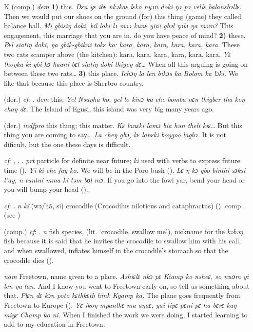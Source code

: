 \begin{letter}{K}
 (comp.) \textit{dem} \textbf{1)} this. \textit{Dɛn yɛ ibɛ nkɔkaɛ lɛko nyɔn doki ŋɔ pɔ vellɛ balansbɔllɛ.} Then we would put our shoes on the ground (for) this thing (game) they called balance ball. \textit{Mi gbisiŋ doki, bil loki lɔ mɔɔ kunɛ yini gbɔl ŋɔlɔ ŋa mɔm?} This engagement, this marriage that you are in, do you have peace of mind? \textbf{2)} these. \textit{Bɛl siatiŋ doki, ŋa gbik-gbikni tokɛ ko: kara, kara, kara, kara, kara, kara.} These two rats scamper above (the kitchen): kara, kara, kara, kara, kara, kara. \textit{Yɛ thoŋka ki gbi kɔ haani bɛl siatiŋ doki thiyeŋ dɛ…} When all this arguing is going on between these two rats… \textbf{3)} this place. \textit{Ichɔŋ la len bikɔs ka Bolom ka lɔki.} We like that because this place is Sherbro country. 

 (der.) \textit{cf}: . \textit{dem} this. \textit{Yel Nsaŋha ko, yel lo kinɔ ka che bomba nɛn thigber tha koŋ chaŋ dɛ.} The Island of Egusi, this island was very big many years ago.

 (der.) \textit{indfpro} this thing; this matter. \textit{Kɛ lanɛki lamɔ bia hun theli kiɛ…} But this thing you are coming to say… \textit{La cheŋ gbɔ, kɛ lanɛki boŋgoo lagbɔ.} It is not dificult, but the one these days is difficult.

 \textit{cf}: , , . \textit{prt} particle for definite near future; \textit{ki} used with verbs to express future time (\citealt{Sumner1921}). \textit{Yi ki che fay ko.} We will be in the Poro bush (\citealt{Pichl1967}). \textit{Lɛ ŋ kɔ gbo binthi sɔksi l'ay, n tuntni mma ki təm bo̹l mɔ.} If you go into the fowl yar, bend your head or you will bump your head (\citealt{Pichl1967}). 

 \textit{cf}: . \textit{n} \textit{kï} (wɔ/hã, si) crocodile (Crocodilus niloticus and cataphractus) (\citealt{Pichl1967}). comp.  (see ) 

 (comp.) \textit{cf}: . \textit{n} fish species, (lit. ‘crocodile, swallow me'), nickname for the \textit{kəbəŋ} fish because it is said that he invites the crocodile to swallow him with his call, and when swallowed, inflates himself in the crocodile's stomach so that the crocodile dies (\citealt{Pichl1967}). 

 \textit{nam} Freetown, name given to a place. \textit{Ashiɛlɛ nkɔ pɛ Kiamp ko nsheɛ, so nwɔm yi len ŋa lan.} And I know you went to Freetown early on, so tell us something about that. \textit{Plɛn dɛ kɔn poto kɛthkɛth hink Kyamp ka.} The plane goes frequently from Freetown to Europe (\citealt{Pichl1967}). \textit{Yɛ ikoŋ mpanthɛ ma aŋaɛ, yai tipɛ pɛni pɛ ha bɛrɛ kaŋ miyɛ Champ ko ni.} When I finished the work we were doing, I started learning to add to my education in Freetown.


\end{letter}
